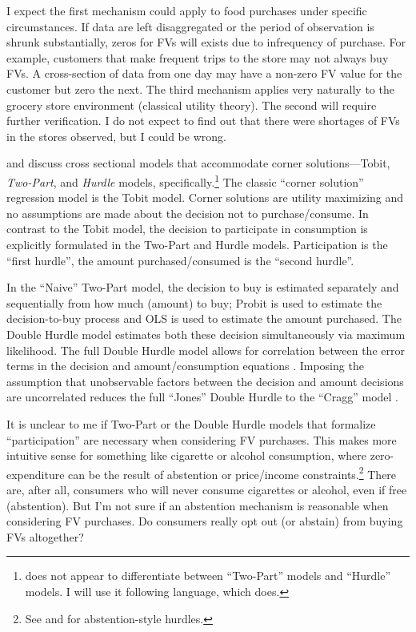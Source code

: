 \documentclass[12pt,letterpaperpaper,]{book}
\begin{document}
I expect the first mechanism could apply to food purchases under
specific circumstances. If data are left disaggregated or the period of
observation is shrunk substantially, zeros for FVs will exists due to
infrequency of purchase. For example, customers that make frequent trips
to the store may not always buy FVs. A cross-section of data from one
day may have a non-zero FV value for the customer but zero the next. The
third mechanism applies very naturally to the grocery store environment
(classical utility theory). The second will require further
verification. I do not expect to find out that there were shortages of
FVs in the stores observed, but I could be wrong.

\citet{humphreys_dealing_2013} and \citet{carlevaro_multiple_2016}
discuss cross sectional models that accommodate corner
solutions---Tobit, \emph{Two-Part}, and \emph{Hurdle} models,
specifically.\footnote{\citet{wooldridge_econometric_2010} does not
  appear to differentiate between ``Two-Part'' models and ``Hurdle''
  models. I will use it following \citet{humphreys_dealing_2013}
  language, which does.} The classic ``corner solution'' regression
model is the Tobit model. Corner solutions are utility maximizing and no
assumptions are made about the decision not to purchase/consume. In
contrast to the Tobit model, the decision to participate in consumption
is explicitly formulated in the Two-Part and Hurdle models.
Participation is the ``first hurdle'', the amount purchased/consumed is
the ``second hurdle''.

In the ``Naive'' Two-Part model, the decision to buy is estimated
separately and sequentially from how much (amount) to buy; Probit is
used to estimate the decision-to-buy process and OLS is used to estimate
the amount purchased. The Double Hurdle model estimates both these
decision simultaneously via maximum likelihood. The full Double Hurdle
model allows for correlation between the error terms in the decision and
amount/consumption equations \citep{jones_note_1992}. Imposing the
assumption that unobservable factors between the decision and amount
decisions are uncorrelated reduces the full ``Jones'' Double Hurdle to
the ``Cragg'' model \citep{cragg_statistical_1971}.

It is unclear to me if Two-Part or the Double Hurdle models that
formalize ``participation'' are necessary when considering FV purchases.
This makes more intuitive sense for something like cigarette or alcohol
consumption, where zero-expenditure can be the result of abstention or
price/income constraints.\footnote{See \citet{garcia_alternative_1996}
  and \citet{aristei_cohort_2008} for abstention-style hurdles.} There
are, after all, consumers who will never consume cigarettes or alcohol,
even if free (abstention). But I'm not sure if an abstention mechanism
is reasonable when considering FV purchases. Do consumers really opt out
(or abstain) from buying FVs altogether?
\end{document}
